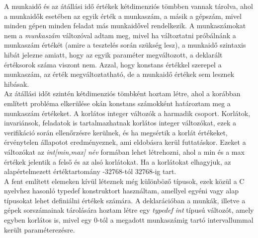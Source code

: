 \documentclass [12pt]{report}
\begin{document}
       A munkaidő és az átállási idő értékek kétdimenziós tömbben vannak tárolva, ahol a munkaidők esetében az egyik érték a munkaszám, a másik a gépszám, mivel minden gépen minden feladat más munkaidővel rendelkezik. A munkaszámokat nem a \emph{munkaszám} változóval adtam meg, mivel ha változtatni próbálnánk a munkaszám értékét (amire a tesztelés során szükség lesz), a munkaidő szintaxis hibát jelezne amiatt, hogy az egyik paraméter megváltozott, a deklarált értéksorok száma viszont nem. Azzal, hogy konstans értékkel szerepel a munkaszám, az érték megváltoztatható, de a munkaidő értékek sem lesznek hibásak. \\
       Az átállási időt szintén kétdimenziós tömbként hoztam létre, ahol a korábban említett probléma elkerülése okán konstans számokként határoztam meg a munkaszám értékeket. 
      A korlátos integer változók a harmadik csoport. Korlátok, invariánsok, feladatok is tartalmazhatnak korlátos integer változókat, ezek a verifikáció során ellenőrzésre kerülnek, és ha megsértik a korlát értékeket, érvénytelen állapotot eredményeznek, ami eldobásra kerül futtatáskor. Ezeket a változókat az \emph{int[min,max] név} formában lehet létrehozni, ahol a min és a max értékek jelentik a felső és az alsó korlátokat. Ha a korlátokat elhagyjuk, az alapértelmezett értéktartomány -32768-tól 32768-ig tart.\\
      A fent említett elemeken kívül léteznek még különböző típusok, ezek közül a C nyelvhez hasonló typedef konstruktort használtam, amellyel egyéni vagy alap típusokat lehet definiálni értékek számára. A deklarációban a munkák, illetve a gépek sorszámainak tárolására hoztam létre egy \emph{typedef int} típusú változót, amely egyben korlátos is, mivel egy 0-tól a megadott munkaszámig tartó intervallummal került paraméterezésre.
      \\
      
\end{document}
